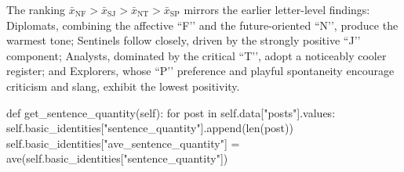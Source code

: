\documentclass[12pt]{article}
\begin{document}
	The ranking $\bar{x}_{\text{NF}}>\bar{x}_{\text{SJ}}>\bar{x}_{\text{NT}}>\bar{x}_{\text{SP}}$ mirrors the earlier letter-level findings: Diplomats, combining the affective “F’’ and the future-oriented “N’’, produce the warmest tone; Sentinels follow closely, driven by the strongly positive “J’’ component; Analysts, dominated by the critical “T’’, adopt a noticeably cooler register; and Explorers, whose “P’’ preference and playful spontaneity encourage criticism and slang, exhibit the lowest positivity. 
	


	
	

	\begin{python}
def get_sentence_quantity(self):
    for post in self.data["posts"].values:
        self.basic_identities["sentence_quantity"].append(len(post))
    self.basic_identities["ave_sentence_quantity"] = ave(self.basic_identities["sentence_quantity"])
	\end{python}
	
	

	\printbibliography[title={References}]
\end{document}
